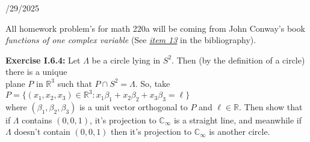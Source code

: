 \documentclass{book}
\newcommand{\inLinkRap}[2]{{\color{blue}\hyperlink{#1}{\textit{#2}}}}
\newcommand{\hTwo}{%
\color{Black}%
   \fontsize{13}{15}\selectfont%
}
\newcommand{\Hstatement}{%
   \color{MidnightBlue!90!Black}%
   \fontsize{12}{13}\selectfont%
}
\newcommand{\blab}[1]{\textbf{#1}}
\newcommand{\retTwo}{\hfill\bigbreak}
\newcommand{\dispDate}[1]{{
   \color{Black}%
   \fontsize{20}{18}\selectfont%
   #1\retTwo
}}
\begin{document}
\setul{0.14em}{0.07em}
\calibri


\hTwo\dispDate{9/29/2025}

All homework problem's for math 220a will be coming from John Conway's book \textit{functions of one complex variable} (See \inLinkRap{bib citation 13}{item 13} in the bibliography).\retTwo

\Hstatement\blab{Exercise I.6.4:} Let $\Lambda$ be a circle lying in $S^2$. Then (by the definition of a circle) there is a unique\\ plane $P$ in $\mathbb{R}^3$ such that $P \cap S^2 = \Lambda$. So, take $P = \{(x_1, x_2, x_3) \in \mathbb{R}^3 : x_1\beta_1 + x_2\beta_2 + x_3\beta_3 = \ell\}$\\ where $(\beta_1, \beta_2, \beta_3)$ is a unit vector orthogonal to $P$ and $\ell \in \mathbb{R}$. Then show that if $\Lambda$ contains $(0, 0, 1)$, it's projection to $\mathbb{C}_\infty$ is a straight line, and meanwhile if $\Lambda$ doesn't contain $(0, 0, 1)$ then it's projection to $\mathbb{C}_\infty$ is another circle.
\end{document}
